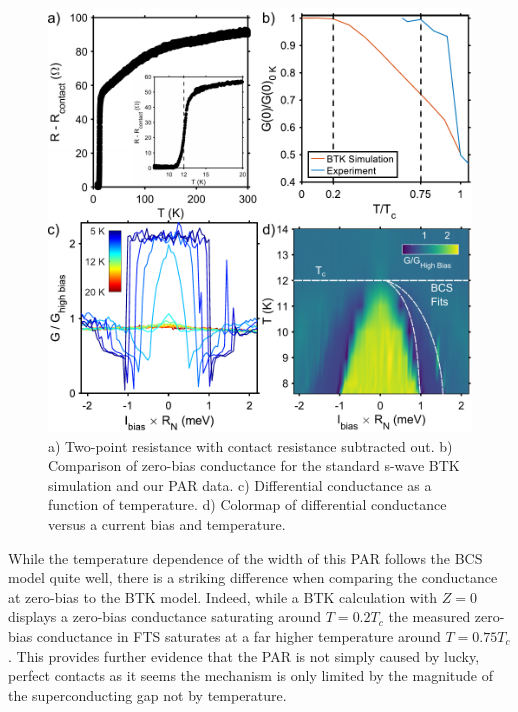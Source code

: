 \begin{figure}[h]
    \centering
    \includegraphics[width = \textwidth]{Chap4/Figures/Temperature.pdf}
    \caption{a) Two-point resistance with contact resistance subtracted out. b) Comparison of zero-bias conductance for the standard s-wave BTK simulation and our \ac{PAR} data. c) Differential conductance as a function of temperature. d) Colormap of differential conductance versus a current bias and temperature.}
    \label{fig:PARTemp}
\end{figure}
While the temperature dependence of the width of this \ac{PAR} follows the \ac{BCS} model quite well, there is a striking difference when comparing the conductance at zero-bias to the \ac{BTK} model. Indeed, while a \ac{BTK} calculation with $Z=0$ displays a zero-bias conductance saturating around $T=0.2T_{c}$ the measured zero-bias conductance in \ac{FTS} saturates at a far higher temperature around $T = 0.75T_{c}$. This provides further evidence that the \ac{PAR} is not simply caused by lucky, perfect contacts as it seems the mechanism is only limited by the magnitude of the superconducting gap not by temperature.  

